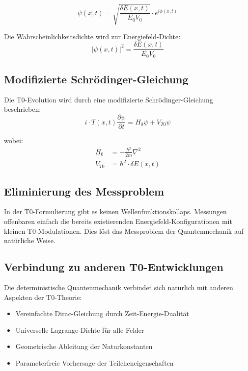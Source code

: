 \documentclass[12pt,a4paper]{article}
\begin{document}
		\begin{equation}
			\psi(x,t) = \sqrt{\frac{\delta E(x,t)}{E_0 V_0}} \cdot e^{i\phi(x,t)}
		\end{equation}
		
		Die Wahrscheinlichkeitsdichte wird zur Energiefeld-Dichte:
		\begin{equation}
			|\psi(x,t)|^2 = \frac{\delta E(x,t)}{E_0 V_0}
		\end{equation}
		
		\subsection{Modifizierte Schr\"odinger-Gleichung}
		
		Die T0-Evolution wird durch eine modifizierte Schr\"odinger-Gleichung beschrieben:
		\begin{equation}
			i \cdot T(x,t) \frac{\partial\psi}{\partial t} = H_0 \psi + V_{T0} \psi
		\end{equation}
		
		wobei:
		\begin{align}
			H_0 &= -\frac{\hbar^2}{2m} \nabla^2 \\
			V_{T0} &= \hbar^2 \cdot \delta E(x,t)
		\end{align}
		
		\subsection{Eliminierung des Messproblem}
		
		In der T0-Formulierung gibt es keinen Wellenfunktionskollaps. Messungen offenbaren einfach die bereits existierenden Energiefeld-Konfigurationen mit kleinen T0-Modulationen. Dies l\"ost das Messproblem der Quantenmechanik auf nat\"urliche Weise.
		
		\subsection{Verbindung zu anderen T0-Entwicklungen}
		
		Die deterministische Quantenmechanik verbindet sich nat\"urlich mit anderen Aspekten der T0-Theorie:
		\begin{itemize}
			\item Vereinfachte Dirac-Gleichung durch Zeit-Energie-Dualit\"at
			\item Universelle Lagrange-Dichte f\"ur alle Felder
			\item Geometrische Ableitung der Naturkonstanten
			\item Parameterfreie Vorhersage der Teilcheneigenschaften
		\end{itemize}
	
\end{document}
